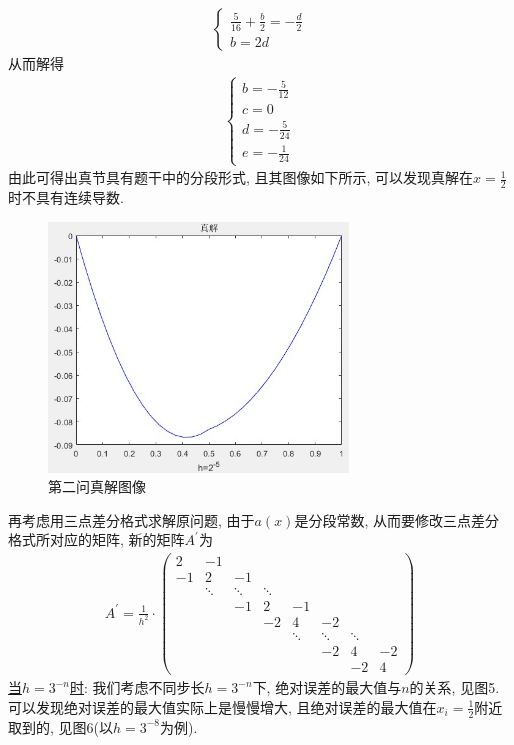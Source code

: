 \documentclass[12pt]{article}
\begin{document}
\begin{align*}
	\begin{cases}
		\frac{5}{16}+\frac{b}{2}=-\frac{d}{2}\\
		b=2d
	\end{cases}
\end{align*}
\noindent 从而解得
\begin{align*}
	\begin{cases}
		b=-\frac{5}{12}\\
		c=0\\
		d=-\frac{5}{24}\\
		e=-\frac{1}{24}
	\end{cases}
\end{align*}
\noindent 由此可得出真节具有题干中的分段形式, 且其图像如下所示, 可以发现真解在$x=\frac{1}{2}$时不具有连续导数.
\begin{figure}[H]
	\centering
	\includegraphics[width=0.71\textwidth]{8}
	\caption{第二问真解图像}
\end{figure}
\noindent 再考虑用三点差分格式求解原问题, 由于$a(x)$是分段常数, 从而要修改三点差分格式所对应的矩阵, 新的矩阵$A^{'}$为
\begin{align*}
	A^{'}=\frac{1}{h^2}\cdot\begin{pmatrix}
		 2 & -1\\
		 -1 & 2&-1\\
		&\ddots&\ddots &\ddots\\
		&&-1&2&-1\\
		& && -2&4&-2\\
		&&&&\ddots&\ddots&\ddots\\
		&&&&&-2&4&-2\\
		&&&&&&-2&4
	\end{pmatrix}
\end{align*}
\noindent \underline{当$h=3^{-n}$时}: 我们考虑不同步长$h=3^{-n}$下, 绝对误差的最大值与$n$的关系, 见图5. 可以发现绝对误差的最大值实际上是慢慢增大, 且绝对误差的最大值在$x_i=\frac{1}{2}$附近取到的, 见图6(以$h=3^{-8}$为例).
\end{document}
